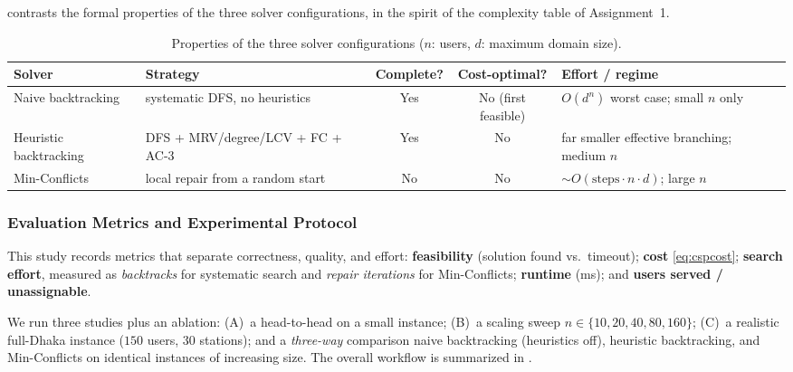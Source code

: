 \documentclass{ai-lab-report}
\begin{document}
 contrasts the formal properties of the three solver configurations, in the spirit of the complexity table of Assignment~1.

\begin{table}[H]
\centering
\small
\begin{tabularx}{\linewidth}{@{}lXccX@{}}
\toprule
Solver & Strategy & Complete? & Cost-optimal? & Effort / regime \\
\midrule
Naive backtracking & systematic DFS, no heuristics & Yes & No (first feasible) & $O(d^{n})$ worst case; small $n$ only \\
Heuristic backtracking & DFS + MRV/degree/LCV + FC + AC-3 & Yes & No & far smaller effective branching; medium $n$ \\
Min-Conflicts & local repair from a random start & No & No & $\sim\!O(\text{steps}\cdot n\cdot d)$; large $n$ \\
\bottomrule
\end{tabularx}
\caption{Properties of the three solver configurations ($n$: users, $d$: maximum domain size).}
\label{tab:a2solvers}
\end{table}

\subsubsection{Evaluation Metrics and Experimental Protocol}
This study records metrics that separate correctness, quality, and effort: \textbf{feasibility} 
(solution found vs.\ timeout); \textbf{cost} \cref{eq:cspcost}; \textbf{search effort}, measured as 
\emph{backtracks} for systematic search and \emph{repair iterations} for Min-Conflicts; \textbf{runtime} (ms); and \textbf{users served / unassignable}.

We run three studies plus an ablation: (A)~a head-to-head on a small instance; (B)~a scaling sweep $n\in\{10,20,40,80,160\}$; (C)~a realistic full-Dhaka instance ($150$ users, $30$ stations); and a \emph{three-way} comparison naive backtracking (heuristics off), heuristic backtracking, and Min-Conflicts on identical instances of increasing size. The overall workflow is summarized in .
\end{document}
